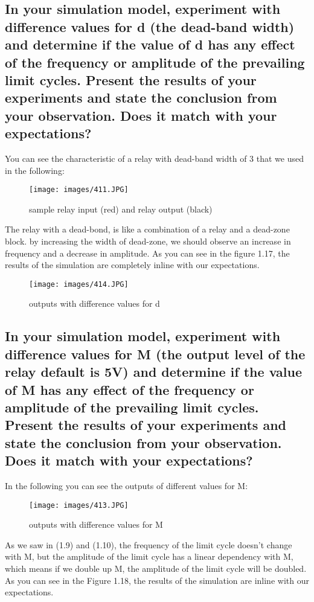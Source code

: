 \documentclass[11pt]{scrartcl} %
\begin{document}
\subsection{In your simulation model, experiment with diﬀerence values for d (the dead-band width) and determine if the value of d has any eﬀect of the frequency or amplitude of the prevailing limit cycles. Present the results of your experiments and state the conclusion from your observation. Does it match with your expectations?}
You can see the characteristic of a relay with dead-band width of 3 that we used in the following:
\begin{figure}[H]
	\centering
	\texttt{[image: images/411.JPG]}
	\caption{sample relay input (red) and relay output (black)}
\end{figure}
The relay with a dead-bond, is like a combination of a relay and a dead-zone block. by increasing the width of dead-zone, we should observe an increase in frequency and a decrease in amplitude. As you can see in the figure 1.17, the results of the simulation are completely inline with our expectations.

\begin{figure}[H]
	\centering
	\texttt{[image: images/414.JPG]}
	\caption{outputs with diﬀerence values for d}
\end{figure}



\subsection{ In your simulation model, experiment with diﬀerence values for M (the output level of the relay default is 5V) and determine if the value of M has any eﬀect of the frequency or amplitude of the prevailing limit cycles. Present the results of your experiments and state the conclusion from your observation. Does it match with your expectations?}

In the following you can see the outputs of diﬀerent values for M:
\begin{figure}[H]
	\centering
	\texttt{[image: images/413.JPG]}
	\caption{outputs with diﬀerence values for M}
\end{figure}

As we saw in (1.9) and (1.10), the frequency of the limit cycle doesn't change with M, but the amplitude of the limit cycle has a linear dependency with M, which means if we double up M, the amplitude of the limit cycle will be doubled. As you can see in the Figure 1.18, the results of the simulation are inline with our expectations.
\end{document}
